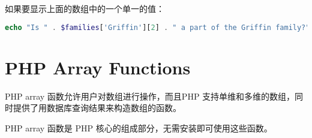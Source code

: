 如果要显示上面的数组中的一个单一的值：


\begin{lstlisting}[language=PHP]
echo "Is " . $families['Griffin'][2] . " a part of the Griffin family?"; 
\end{lstlisting}





\section{PHP Array Functions}


PHP array 函数允许用户对数组进行操作，而且PHP 支持单维和多维的数组，同时提供了用数据库查询结果来构造数组的函数。

PHP array 函数是 PHP 核心的组成部分，无需安装即可使用这些函数。




